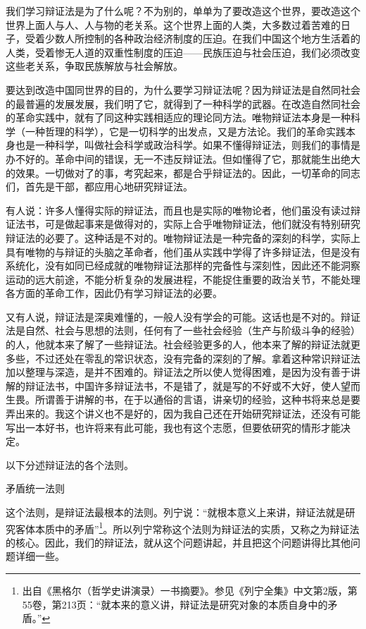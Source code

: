 \documentclass[UTF8, 12pt, a4paper]{ctexrep}
\begin{document}
我们学习辩证法是为了什么呢？不为别的，单单为了要改造这个世界，要改造这个世界上面人与人、人与物的老关系。这个世界上面的人类，大多数过着苦难的日子，受着少数人所控制的各种政治经济制度的压迫。在我们中国这个地方生活着的人类，受着惨无人道的双重性制度的压迫——民族压迫与社会压迫，我们必须改变这些老关系，争取民族解放与社会解放。

要达到改造中国同世界的目的，为什么要学习辩证法呢？因为辩证法是自然同社会的最普遍的发展发展，我们明了它，就得到了一种科学的武器。在改造自然同社会的革命实践中，就有了同这种实践相适应的理论同方法。唯物辩证法本身是一种科学（一种哲理的科学），它是一切科学的出发点，又是方法论。我们的革命实践本身也是一种科学，叫做社会科学或政治科学。如果不懂得辩证法，则我们的事情是办不好的。革命中间的错误，无一不违反辩证法。但如懂得了它，那就能生出绝大的效果。一切做对了的事，考究起来，都是合乎辩证法的。因此，一切革命的同志们，首先是干部，都应用心地研究辩证法。

有人说：许多人懂得实际的辩证法，而且也是实际的唯物论者，他们虽没有读过辩证法书，可是做起事来是做得对的，实际上合乎唯物辩证法，他们就没有特别研究辩证法的必要了。这种话是不对的。唯物辩证法是一种完备的深刻的科学，实际上具有唯物的与辩证的头脑之革命者，他们虽从实践中学得了许多辩证法，但是没有系统化，没有如同已经成就的唯物辩证法那样的完备性与深刻性，因此还不能洞察运动的远大前途，不能分析复杂的发展进程，不能捉住重要的政治关节，不能处理各方面的革命工作，因此仍有学习辩证法的必要。

又有人说，辩证法是深奥难懂的，一般人没有学会的可能。这话也是不对的。辩证法是自然、社会与思想的法则，任何有了一些社会经验（生产与阶级斗争的经验）的人，他就本来了解了一些辩证法。社会经验更多的人，他本来了解的辩证法就更多些，不过还处在零乱的常识状态，没有完备的深刻的了解。拿着这种常识辩证法加以整理与深造，是并不困难的。辩证法之所以使人觉得困难，是因为没有善于讲解的辩证法书，中国许多辩证法书，不是错了，就是写的不好或不大好，使人望而生畏。所谓善于讲解的书，在于以通俗的言语，讲亲切的经验，这种书将来总是要弄出来的。我这个讲义也不是好的，因为我自己还在开始研究辩证法，还没有可能写出一本好书，也许将来有此可能，我也有这个志愿，但要依研究的情形才能决定。

以下分述辩证法的各个法则。

矛盾统一法则

这个法则，是辩证法最根本的法则。列宁说：“就根本意义上来讲，辩证法就是研究客体本质中的矛盾”\footnote{出自《黑格尔（哲学史讲演录）一书摘要》。参见《列宁全集》中文第2版，第55卷，第213页：“就本来的意义讲，辩证法是研究对象的本质自身中的矛盾。”}。所以列宁常称这个法则为辩证法的实质，又称之为辩证法的核心。因此，我们的辩证法，就从这个问题讲起，并且把这个问题讲得比其他问题详细一些。
\end{document}
